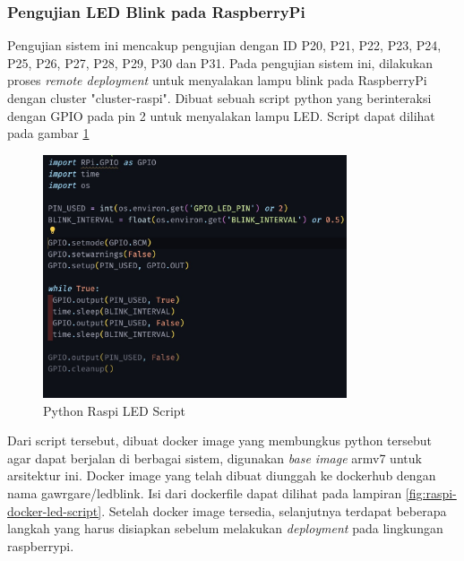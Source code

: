 \subsubsection{Pengujian LED Blink pada RaspberryPi}

Pengujian sistem ini mencakup pengujian dengan ID P20, P21, P22, P23, P24, P25, P26, P27, P28, P29, P30 dan P31. Pada pengujian sistem ini, dilakukan proses \textit{remote deployment} untuk menyalakan lampu blink pada RaspberryPi dengan cluster "cluster-raspi". Dibuat sebuah script python yang berinteraksi dengan GPIO pada pin 2 untuk menyalakan lampu LED. Script dapat dilihat pada gambar \ref{fig:raspi-python-led-script}

\begin{figure}[ht]
  \centering
  \includegraphics[width=0.8\textwidth]{resources/chapter-4/pengujian/pengujian-sistem-raspi-09-led.jpg}
  \caption{Python Raspi LED Script}
  \label{fig:raspi-python-led-script}
\end{figure}

Dari script tersebut, dibuat docker image yang membungkus python tersebut agar dapat berjalan di berbagai sistem, digunakan \textit{base image} armv7 untuk arsitektur ini. Docker image yang telah dibuat diunggah ke dockerhub dengan nama {gawrgare/led\textunderscore blink}. Isi dari dockerfile dapat dilihat pada lampiran \ref{fig:raspi-docker-led-script}. Setelah docker image tersedia, selanjutnya terdapat beberapa langkah yang harus disiapkan sebelum melakukan \textit{deployment} pada lingkungan raspberrypi.

